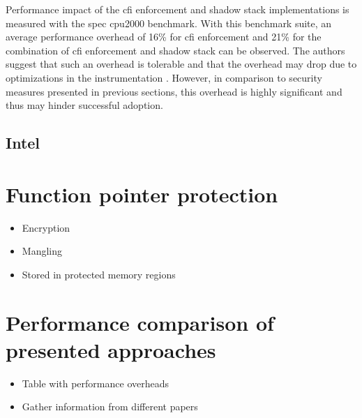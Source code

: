 Performance impact of the \gls{cfi} enforcement and shadow stack implementations is measured with the \gls{spec} \acs{cpu}2000 benchmark.
With this benchmark suite, an average performance overhead of 16\% for \gls{cfi} enforcement and 21\% for the combination of \gls{cfi} enforcement and shadow stack can be observed.
The authors suggest that such an overhead is tolerable and that the overhead may drop due to optimizations in the instrumentation \cite[346\psq,349\psq]{Abadi2005}.
However, in comparison to security measures presented in previous sections, this overhead is highly significant and thus may hinder successful adoption.

\subsection{Intel }
\label{subsec:cfi-intel-cet}

\section{Function pointer protection}
\label{sec:function-pointer-protection-improvements}


\begin{itemize}
	\item{Encryption}
	\item{Mangling}
	\item{Stored in protected memory regions}
\end{itemize}

\section{Performance comparison of presented approaches}
\label{sec:performance-comparison}

\begin{itemize}
	\item{Table with performance overheads}
	\item{Gather information from different papers}
\end{itemize}